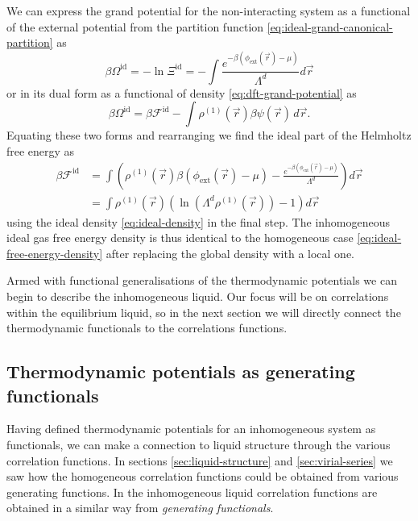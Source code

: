 We can express the grand potential for the non-interacting system as a functional of the external potential from the partition function \eqref{eq:ideal-grand-canonical-partition} as
\begin{equation*}
  \beta\Omega^\mathrm{id}
  =
  - \ln{\Xi^\mathrm{id}}
  =
  - \int \frac{e^{-\beta (\phi_\mathrm{ext}(\vec{r}) - \mu)}}{\Lambda^d} d\vec{r}
\end{equation*}
or in its dual form as a functional of density \eqref{eq:dft-grand-potential} as
\begin{equation*}
  \beta\Omega^\mathrm{id}
  =
  \beta \mathcal{F}^\mathrm{id}
  - \int \rho^{(1)}(\vec{r}) \beta \psi(\vec{r}) \, d\vec{r}.
\end{equation*}
Equating these two forms and rearranging we find the ideal part of the Helmholtz free energy as
\begin{align}
  \beta \mathcal{F}^\mathrm{id}
  &=
  \int
  \left(
  \rho^{(1)}(\vec{r}) \beta (\phi_\mathrm{ext}(\vec{r}) - \mu)
  - \frac{e^{-\beta (\phi_\mathrm{ext}(\vec{r}) - \mu)}}{\Lambda^d}
  \right)
  d\vec{r}
  \nonumber \\ &=
  \int
  \rho^{(1)}(\vec{r})
  \left(
  \ln{(\Lambda^d \rho^{(1)}(\vec{r}))} - 1
  \right)
  d\vec{r}
  \label{eq:ideal-free-energy-functional}
\end{align}
using the ideal density \eqref{eq:ideal-density} in the final step.
The inhomogeneous ideal gas free energy density is thus identical to the homogeneous case \eqref{eq:ideal-free-energy-density} after replacing the global density with a local one.

Armed with functional generalisations of the thermodynamic potentials we can begin to describe the inhomogeneous liquid.
Our focus will be on correlations within the equilibrium liquid, so in the next section we will directly connect the thermodynamic functionals to the correlations functions.

\subsection{Thermodynamic potentials as generating functionals}

Having defined thermodynamic potentials for an inhomogeneous system as functionals, we can make a connection to liquid structure through the various correlation functions.
In sections \ref{sec:liquid-structure} and \ref{sec:virial-series} we saw how the homogeneous correlation functions could be obtained from various generating functions.
In the inhomogeneous liquid correlation functions are obtained in a similar way from \emph{generating functionals}.


